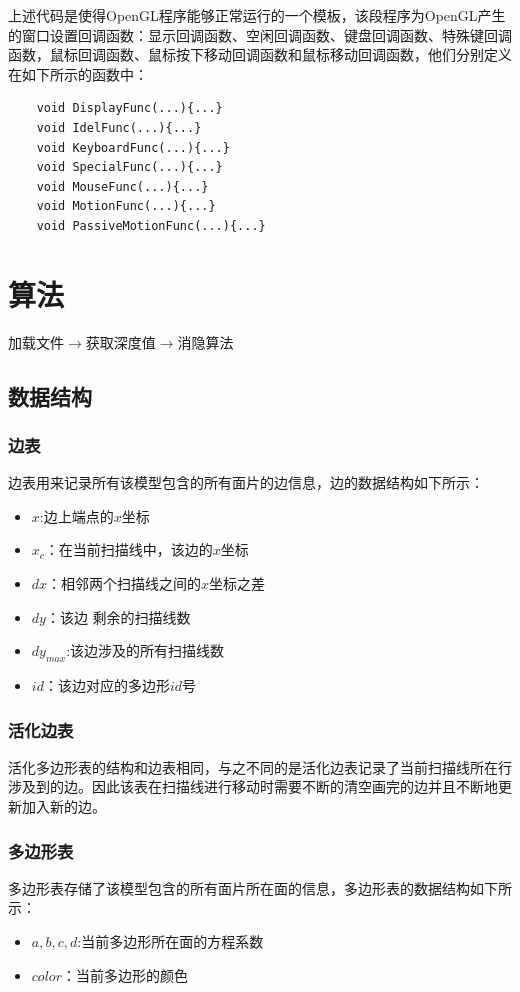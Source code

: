 \documentclass[10pt]{article}
\begin{document}
上述代码是使得OpenGL程序能够正常运行的一个模板，该段程序为OpenGL产生的窗口设置回调函数：显示回调函数、空闲回调函数、键盘回调函数、特殊键回调函数，鼠标回调函数、鼠标按下移动回调函数和鼠标移动回调函数，他们分别定义在如下所示的函数中：
\begin{lstlisting}
	void DisplayFunc(...){...}
	void IdelFunc(...){...}
	void KeyboardFunc(...){...}
	void SpecialFunc(...){...}
	void MouseFunc(...){...}
	void MotionFunc(...){...}
	void PassiveMotionFunc(...){...}
\end{lstlisting}


\section{算法}
加载文件$\to$获取深度值$\to$消隐算法
\subsection{数据结构}
\subsubsection{边表}
边表用来记录所有该模型包含的所有面片的边信息，边的数据结构如下所示：
\begin{itemize}
\item{$x$:边上端点的$x$坐标}
\item{$x_c$：在当前扫描线中，该边的$x$坐标}
\item{$dx$：相邻两个扫描线之间的$x$坐标之差}
\item{$dy$：该边{\color{red} 剩余的}扫描线数}
\item{$dy_{max}$:该边涉及的所有扫描线数}
\item{$id$：该边对应的多边形$id$号}
\end{itemize}
\subsubsection{活化边表}
活化多边形表的结构和边表相同，与之不同的是活化边表记录了当前扫描线所在行涉及到的边。因此该表在扫描线进行移动时需要不断的清空画完的边并且不断地更新加入新的边。

\subsubsection{多边形表}
多边形表存储了该模型包含的所有面片所在面的信息，多边形表的数据结构如下所示：
\begin{itemize}
\item{$a,b,c,d$:当前多边形所在面的方程系数}
\item{$color$：当前多边形的颜色}
\end{itemize}
\end{document}
